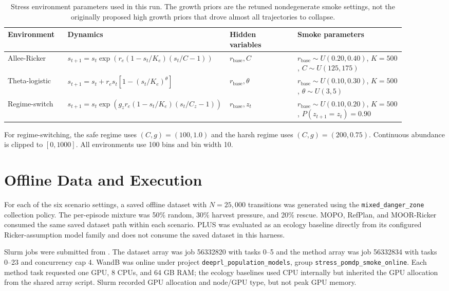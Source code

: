 \documentclass[11pt]{article}
\begin{document}
\begin{table}[h]
\centering
\caption{Stress environment parameters used in this run. The growth priors are
the retuned nondegenerate smoke settings, not the originally proposed high
growth priors that drove almost all trajectories to collapse.}
\begin{small}
\begin{tabular}{p{0.15\linewidth}p{0.31\linewidth}p{0.17\linewidth}p{0.27\linewidth}}
\toprule
Environment & Dynamics & Hidden variables & Smoke parameters \\
\midrule
Allee-Ricker &
$s_{t+1}=s_t\exp(r_e(1-s_t/K_e)(s_t/C-1))$ &
$r_{\mathrm{base}}, C$ &
$r_{\mathrm{base}}\sim U(0.20,0.40)$, $K=500$, $C\sim U(125,175)$ \\
Theta-logistic &
$s_{t+1}=s_t+r_e s_t[1-(s_t/K_e)^\theta]$ &
$r_{\mathrm{base}}, \theta$ &
$r_{\mathrm{base}}\sim U(0.10,0.30)$, $K=500$, $\theta\sim U(3,5)$ \\
Regime-switch &
$s_{t+1}=s_t\exp(g_z r_e(1-s_t/K_e)(s_t/C_z-1))$ &
$r_{\mathrm{base}}, z_t$ &
$r_{\mathrm{base}}\sim U(0.10,0.20)$, $K=500$, $P(z_{t+1}=z_t)=0.90$ \\
\bottomrule
\end{tabular}
\end{small}
\end{table}

For regime-switching, the safe regime uses $(C,g)=(100,1.0)$ and the harsh
regime uses $(C,g)=(200,0.75)$. Continuous abundance is clipped to $[0,1000]$.
All environments use 100 bins and bin width 10.

\section{Offline Data and Execution}

For each of the six scenario settings, a saved offline dataset with
$N=25{,}000$ transitions was generated using the \texttt{mixed\_danger\_zone}
collection policy. The per-episode mixture was 50\% random, 30\% harvest
pressure, and 20\% rescue. MOPO, RefPlan, and MOOR-Ricker consumed the same
saved dataset path within each scenario. PLUS was evaluated as an ecology
baseline directly from its configured Ricker-assumption model family and does
not consume the saved dataset in this harness.

Slurm jobs were submitted from .
The dataset array was job 56332820 with tasks 0--5 and the method array was
job 56332834 with tasks 0--23 and concurrency cap 4. WandB was online under
project \texttt{deeprl\_population\_models}, group
\texttt{stress\_pomdp\_smoke\_online}. Each method task requested one GPU,
8 CPUs, and 64 GB RAM; the ecology baselines used CPU internally but inherited
the GPU allocation from the shared array script. Slurm recorded GPU allocation
and node/GPU type, but not peak GPU memory.
\end{document}

